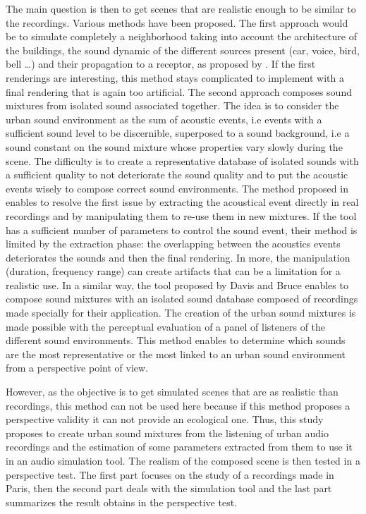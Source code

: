 \documentclass[a4,11pt,twocolumn]{article}
\begin{document}
The main question is then to get scenes that are realistic enough to be similar to the recordings. Various methods have been proposed. The first approach would be to simulate completely a neighborhood taking into account the architecture of the buildings, the sound dynamic of the different sources present (car, voice, bird, bell \dots) and their propagation to a receptor, as proposed by \cite{cstb_simulation_2015}. If the first renderings are interesting, this method stays complicated to implement with a final rendering that is again too artificial.
The second approach composes sound mixtures from isolated sound associated together. The idea is to consider the urban sound environment as the sum of acoustic events, i.e events with a sufficient sound level to be discernible, superposed to a sound background, i.e a sound constant on the sound mixture whose properties vary slowly during the scene. The difficulty is to create a representative database of isolated sounds with a sufficient quality to not deteriorate the sound quality and to put the acoustic events wisely to compose correct sound environments. The method proposed in \cite{misra_musical_2007} enables to resolve the first issue by extracting the acoustical event directly in real recordings and by manipulating them to re-use them in new mixtures. If the tool has a sufficient number of parameters to control the sound event, their method is limited by the extraction phase: the overlapping between the acoustics events deteriorates the sounds and then the final rendering. In more, the manipulation (duration, frequency range) can create artifacts that can be a limitation for a realistic use. In a similar way, the tool proposed by Davis and Bruce \cite{bruce_development_2009} enables to compose sound mixtures with an isolated sound database composed of recordings made specially for their application. The creation of the urban sound mixtures is made possible with the perceptual evaluation of a panel of listeners of the different sound environments. This method enables to determine which sounds are the most representative or the most linked to an urban sound environment from a perspective point of view.

However, as the objective is to get simulated scenes that are as realistic than recordings, this method can not be used here because if this method proposes a perspective validity it can not provide an ecological one. Thus, this study proposes to create urban sound mixtures from the listening of urban audio recordings and the estimation of some parameters extracted from them to use it in an audio simulation tool. The realism of the composed scene is then tested in a perspective test. The first part focuses on the study of a recordings made in Paris, then the second part deals with the simulation tool and the last part summarizes the result obtains in the perspective test.
\end{document}
